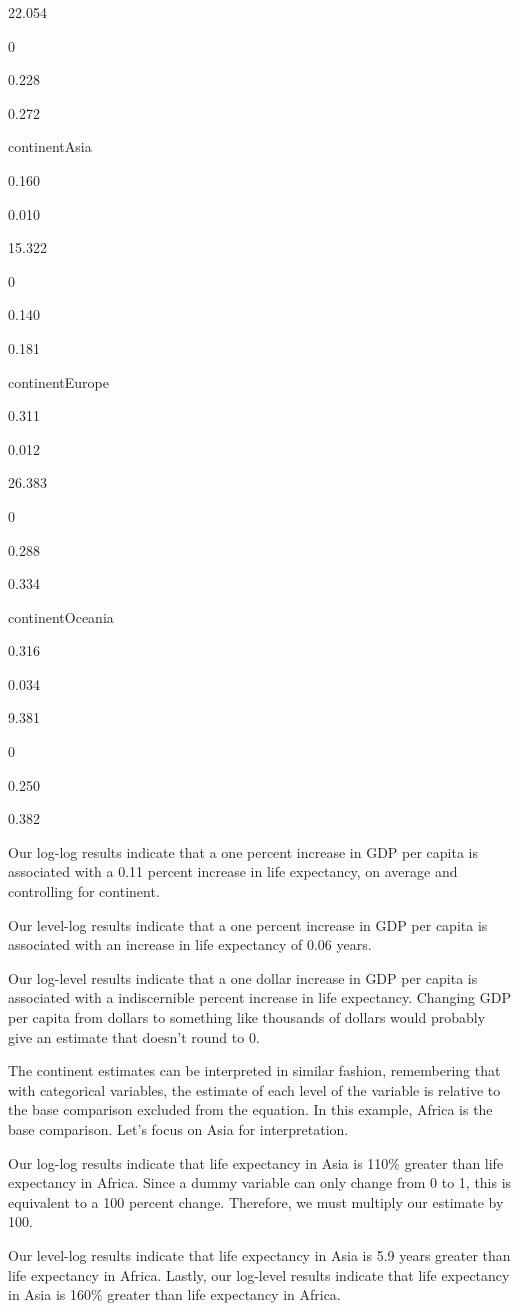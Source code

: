 \documentclass[
]{book}
\begin{document}
22.054

0

0.228

0.272

continentAsia

0.160

0.010

15.322

0

0.140

0.181

continentEurope

0.311

0.012

26.383

0

0.288

0.334

continentOceania

0.316

0.034

9.381

0

0.250

0.382

Our log-log results indicate that a one percent increase in GDP per capita is associated with a 0.11 percent increase in life expectancy, on average and controlling for continent.

Our level-log results indicate that a one percent increase in GDP per capita is associated with an increase in life expectancy of 0.06 years.

Our log-level results indicate that a one dollar increase in GDP per capita is associated with a indiscernible percent increase in life expectancy. Changing GDP per capita from dollars to something like thousands of dollars would probably give an estimate that doesn't round to 0.

The continent estimates can be interpreted in similar fashion, remembering that with categorical variables, the estimate of each level of the variable is relative to the base comparison excluded from the equation. In this example, Africa is the base comparison. Let's focus on Asia for interpretation.

Our log-log results indicate that life expectancy in Asia is 110\% greater than life expectancy in Africa. Since a dummy variable can only change from 0 to 1, this is equivalent to a 100 percent change. Therefore, we must multiply our estimate by 100.

Our level-log results indicate that life expectancy in Asia is 5.9 years greater than life expectancy in Africa. Lastly, our log-level results indicate that life expectancy in Asia is 160\% greater than life expectancy in Africa.
\end{document}
